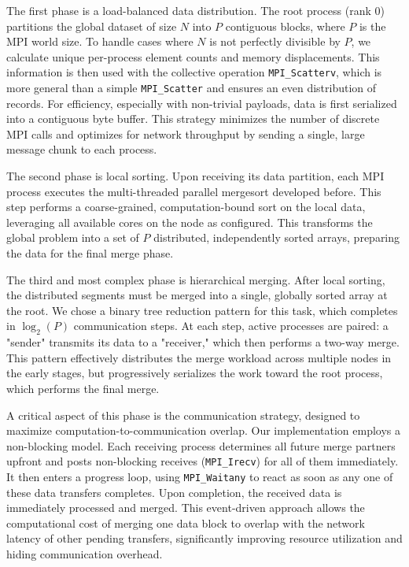 \documentclass[10pt]{article}
\newcommand{\code}[1]{\texttt{#1}}
\begin{document}
The first phase is a load-balanced data distribution. The root process (rank 0) partitions the global dataset of size $N$ into $P$ contiguous blocks, where $P$ is the MPI world size. To handle cases where $N$ is not perfectly divisible by $P$, we calculate unique per-process element counts and memory displacements. This information is then used with the collective operation \code{MPI\_Scatterv}, which is more general than a simple \code{MPI\_Scatter} and ensures an even distribution of records. For efficiency, especially with non-trivial payloads, data is first serialized into a contiguous byte buffer. This strategy minimizes the number of discrete MPI calls and optimizes for network throughput by sending a single, large message chunk to each process.

The second phase is local sorting. Upon receiving its data partition, each MPI process executes the multi-threaded parallel mergesort developed before. This step performs a coarse-grained, computation-bound sort on the local data, leveraging all available cores on the node as configured. This transforms the global problem into a set of $P$ distributed, independently sorted arrays, preparing the data for the final merge phase.

The third and most complex phase is hierarchical merging. After local sorting, the distributed segments must be merged into a single, globally sorted array at the root. We chose a binary tree reduction pattern for this task, which completes in $\log_2(P)$ communication steps. At each step, active processes are paired: a "sender" transmits its data to a "receiver," which then performs a two-way merge. This pattern effectively distributes the merge workload across multiple nodes in the early stages, but progressively serializes the work toward the root process, which performs the final merge.

A critical aspect of this phase is the communication strategy, designed to maximize computation-to-communication overlap. Our implementation employs a non-blocking model. Each receiving process determines all future merge partners upfront and posts non-blocking receives (\code{MPI\_Irecv}) for all of them immediately. It then enters a progress loop, using \code{MPI\_Waitany} to react as soon as any one of these data transfers completes. Upon completion, the received data is immediately processed and merged. This event-driven approach allows the computational cost of merging one data block to overlap with the network latency of other pending transfers, significantly improving resource utilization and hiding communication overhead.
\end{document}
